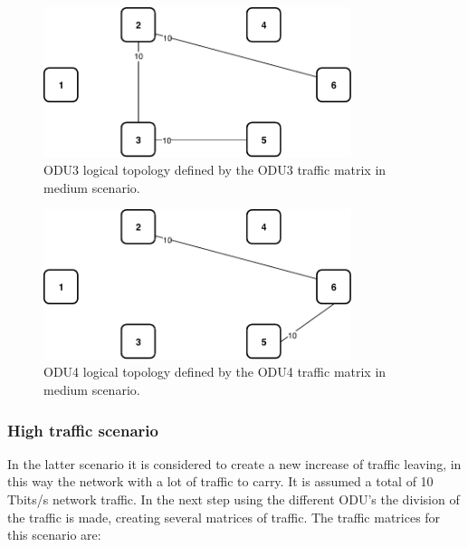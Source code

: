 \begin{figure}[h!]
\centering
\includegraphics[width=9cm]{sdf/ilp/opaque_survivability/figures/logical_topology_ODU3_medium}
\caption{ODU3 logical topology defined by the ODU3 traffic matrix in medium scenario.}
\label{logical_ODU3_medium}
\end{figure}
\newpage
\begin{figure}[h!]
\centering
\includegraphics[width=9cm]{sdf/ilp/opaque_survivability/figures/logical_topology_ODU4_medium}
\caption{ODU4 logical topology defined by the ODU4 traffic matrix in medium scenario.}
\label{logical_ODU4_medium}
\end{figure}

\subsubsection{High traffic scenario}\label{high_traffic_scenario}

In the latter scenario it is considered to create a new increase of traffic leaving, in this way the network with a lot of traffic to carry. It is assumed a total of 10 Tbits/s network traffic.
In the next step using the different ODU's the division of the traffic is made, creating several matrices of traffic.
The traffic matrices for this scenario are:

